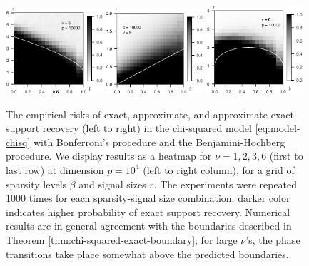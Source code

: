 \begin{figure}
	\includegraphics[width=0.32\textwidth]{figures/sim_strong_boundary/simulated_strong_boundary_chi-squared_nu6_p10000.eps}
    \includegraphics[width=0.32\textwidth]{figures/sim_weak_boundary/simulated_weak_boundary_chi-squared_nu6_p10000.eps}
    \includegraphics[width=0.32\textwidth]{figures/sim_approx-exact_boundary/simulated_approx-exact_boundary_chi-squared_nu6_p10000.eps}
	\caption{The empirical risks of exact, approximate, and approximate-exact support recovery (left to right) in the chi-squared model \eqref{eq:model-chisq} with Bonferroni's procedure and the Benjamini-Hochberg procedure. 
		We display results as a heatmap for $\nu=1, 2, 3, 6$ (first to last row) at dimension $p=10^4$ (left to right column), for a grid of sparsity levels $\beta$ and signal sizes $r$.
		The experiments were repeated 1000 times for each sparsity-signal size combination; darker color indicates higher probability of exact support recovery.  
		Numerical results are in general agreement with the boundaries described in Theorem \ref{thm:chi-squared-exact-boundary}; for large $\nu$'s, the phase transitions take place somewhat above the predicted boundaries.} 
	\label{fig:phase-simulated-chi-squared}
\end{figure}



